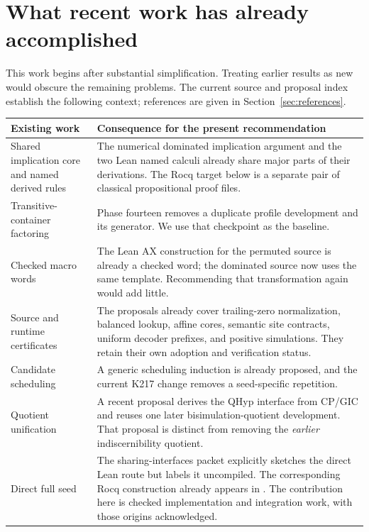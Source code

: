 \documentclass[11pt,letterpaper]{article}
\theoremstyle{definition}
\theoremstyle{remark}
\newcommand{\code}[1]{\texttt{\detokenize{#1}}}
\begin{document}
\section{What recent work has already accomplished}

This work begins after substantial simplification. Treating earlier results as new
would obscure the remaining problems. The current source and proposal index establish
the following context; references are given in Section~\ref{sec:references}.

\begin{longtable}{@{}p{}p{}@{}}
\toprule
Existing work & Consequence for the present recommendation \\
\midrule
\endhead
Shared implication core and named derived rules & The numerical dominated
implication argument and the two Lean named calculi already share major parts of
their derivations. The Rocq target below is a separate pair of classical
propositional proof files. \\[4pt]
Transitive-container factoring & Phase fourteen removes a duplicate profile
development and its generator. We use that checkpoint as the baseline. \\[4pt]
Checked macro words & The Lean AX construction for the permuted source is already
a checked word; the dominated source now uses the same template. Recommending
that transformation again would add little. \\[4pt]
Source and runtime certificates & The proposals already cover trailing-zero
normalization, balanced lookup, affine cores, semantic site contracts, uniform
decoder prefixes, and positive simulations. They retain their own adoption and
verification status. \\[4pt]
Candidate scheduling & A generic scheduling induction is already proposed, and
the current K217 change removes a seed-specific repetition. \\[4pt]
Quotient unification & A recent proposal derives the QHyp interface from CP/GIC
and reuses one later bisimulation-quotient development. That proposal is distinct
from removing the \emph{earlier} indiscernibility quotient. \\[4pt]
Direct full seed & The sharing-interfaces packet explicitly sketches the direct
Lean route but labels it uncompiled. The corresponding Rocq construction already
appears in \code{rocq224/src/Complete222.v}. The contribution here is checked
implementation and integration work, with those origins acknowledged. \\
\bottomrule
\end{longtable}
\end{document}

